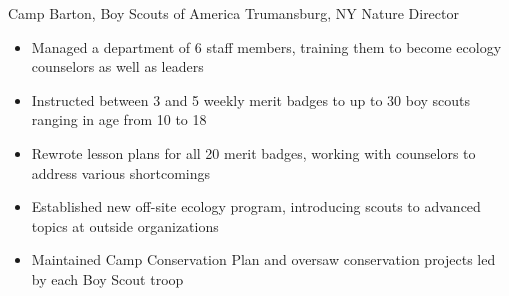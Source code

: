 
        {Camp Barton, Boy Scouts of America}
        {Trumansburg, NY}
        {Nature Director}
        {}{
    \begin{itemize}
        \item Managed a department of 6 staff members, training them to become ecology counselors as well as leaders
        \item Instructed between 3 and 5 weekly merit badges to up to 30 boy scouts ranging in age from 10 to 18
        \item Rewrote lesson plans for all 20 merit badges, working with counselors to address various shortcomings
        \item Established new off-site ecology program, introducing scouts to advanced topics at outside organizations
        \item Maintained Camp Conservation Plan and oversaw conservation projects led by each Boy Scout troop
    \end{itemize}
}
